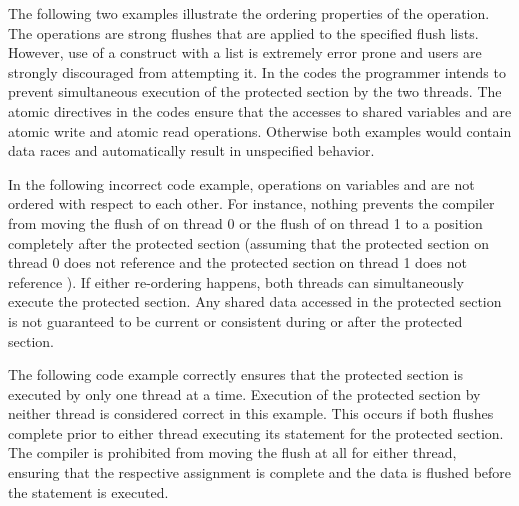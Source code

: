 


The following two examples illustrate the ordering properties of 
the  operation. The  operations are strong flushes 
that are applied to the specified flush lists. 
However, use of a  construct with a list is extremely error 
prone and users are strongly discouraged from attempting it. 
In the codes the programmer intends to prevent simultaneous 
execution of the protected section by the two threads.
The atomic directives in the codes ensure that the accesses to shared
variables  and  are atomic write and atomic read operations. Otherwise both examples would contain data races and automatically result 
in unspecified behavior. 

In the following incorrect code example, operations on variables  and
 are not ordered with respect to each other. For instance, nothing
prevents the compiler from moving the flush of  on thread 0 or the
flush of  on thread 1 to a position completely after the protected
section (assuming that the protected section on thread 0 does not reference
 and the protected section on thread 1 does not reference ).
If either re-ordering happens, both threads can simultaneously execute the
protected section.
Any shared data accessed in the protected section is not guaranteed to 
be current or consistent during or after the protected section. 



The following code example correctly ensures that the protected section
is executed by only one thread at a time. Execution of the protected section
by neither thread is considered correct in this example. This occurs if both
flushes complete prior to either thread executing its  statement
for the protected section.
The compiler is prohibited from moving the flush at all for either thread,
ensuring that the respective assignment is complete and the data is flushed
before the  statement is executed.


